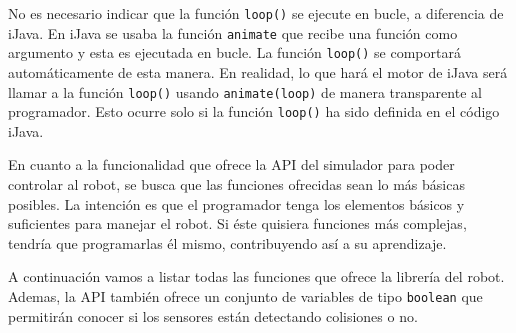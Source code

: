 No es necesario indicar que la función \texttt{loop()} se ejecute en bucle, a diferencia de iJava. En iJava se usaba la función \texttt{animate} que recibe una función como argumento y esta es ejecutada en bucle. La función \texttt{loop()} se comportará automáticamente de esta manera. En realidad, lo que hará el motor de iJava será llamar a la función \texttt{loop()} usando \texttt{animate(loop)} de manera transparente al programador. Esto ocurre solo si la función \texttt{loop()} ha sido definida en el código iJava.


En cuanto a la funcionalidad que ofrece la API del simulador para poder controlar al robot, se busca que las funciones ofrecidas sean lo más básicas posibles. La intención es que el programador tenga los elementos básicos y suficientes para manejar el robot. Si éste quisiera funciones más complejas, tendría que programarlas él mismo, contribuyendo así a su aprendizaje. 

A continuación vamos a listar todas las funciones que ofrece la librería del robot. Ademas, la API también ofrece un conjunto de variables de tipo \texttt{boolean} que permitirán conocer si los sensores están detectando colisiones o no.

